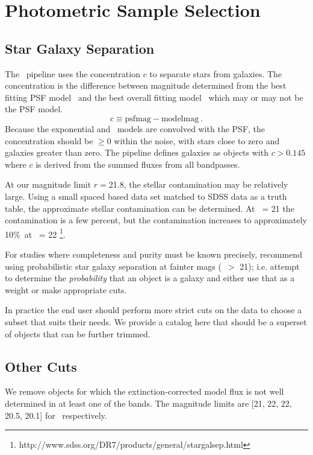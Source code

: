 \documentclass[preprint]{aastex}
\newcommand{\rmax}{21.8}
\newcommand{\contamworst}{10\%}
\begin{document}
\section{Photometric Sample Selection} \label{sec:select}

\subsection{Star Galaxy Separation}

The \photo\ pipeline uses the concentration $c$ to separate stars from
galaxies.  The concentration is the difference between magnitude determined
from the best fitting PSF model \psfmag\ and the best overall fitting model 
\modelmag\ which may or may not be the PSF model.
\begin{equation}
c \equiv \textrm{psfmag} - \textrm{modelmag}~.
\end{equation}
Because the exponential and \devauc\ models are convolved with the PSF, the
concentration should be $\ge 0$ within the noise, with stars close to zero and
galaxies greater than zero.  The pipeline defines galaxies as objects with $c >
0.145$ \citep{dr7classify} where $c$ is derived from the summed fluxes from all
bandpasses.  

At our magnitude limit $r = $\rmax, the stellar contamination may be relatively
large.  Using a small spaced based data set matched to SDSS data as a truth
table, the approximate stellar contamination can be determined.  At \rmag\ = 21
the contamination is a few percent, but the contamination increases to
approximately \contamworst\ at \rmag\ = 22
\footnote{http://www.sdss.org/DR7/products/general/stargalsep.html}.  


For studies where completeness and purity must be known precisely,
\citet{ScrantonMag05} recommend using probabilistic star galaxy separation at
fainter mags (\rmag\ $ > $ 21); i.e.  attempt to determine the {\it
probability} that an object is a galaxy and either use that as a weight or make
appropriate cuts. 


In practice the end user should perform more strict cuts on the data to choose
a subset that suits their needs.  We provide a catalog here that should be a
superset of objects that can be further trimmed.

\subsection{Other Cuts}

We remove objects for which the extinction-corrected model flux is not well
determined in at least one of the bands.  The magnitude limits are [21, 22, 22,
20.5, 20.1] for \allmag\ respectively.
\end{document}
